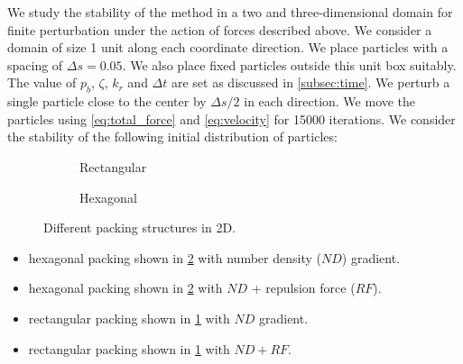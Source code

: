 \documentclass[preprint,12pt]{elsarticle}
\begin{document}
We study the stability of the method in a two and three-dimensional domain
for finite perturbation under the action of forces described above. We
consider a domain of size 1 unit along each coordinate direction. We place
particles with a spacing of $\Delta s = 0.05$. We also place fixed particles
outside this unit box suitably. The value of $p_{b}$, $\zeta$, $k_r$ and
$\Delta t$ are set as discussed in \cref{subsec:time}. We perturb a single
particle close to the center by $\Delta s / 2$ in each direction. We move the
particles using \cref{eq:total_force} and \cref{eq:velocity} for 15000
iterations. We consider the stability of the following initial distribution
of particles:

\begin{figure}[ht!]
  \begin{subfigure}{0.5\textwidth}
    \centering
    \caption{Rectangular}
    \label{fig:rect}
  \end{subfigure}
  \begin{subfigure}{0.5\textwidth}
    \centering
    \caption{Hexagonal}
    \label{fig:hex}
  \end{subfigure}
  \caption{Different packing structures in 2D.}
  \label{fig:packing}
\end{figure}

\begin{itemize}
  \item hexagonal packing shown in \cref{fig:hex} with number density ($ND$) gradient.
  \item hexagonal packing shown in \cref{fig:hex} with $ND$ + repulsion force ($RF$).
  \item rectangular packing shown in \cref{fig:rect} with $ND$ gradient.
  \item rectangular packing shown in \cref{fig:rect} with $ND + RF$.
\end{itemize}
\end{document}

